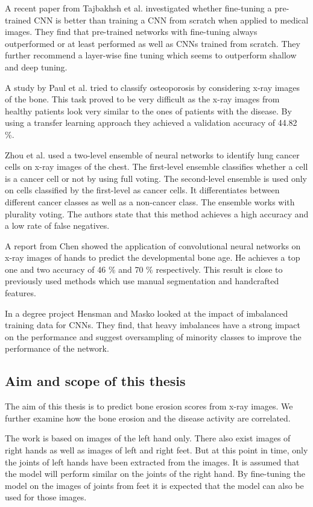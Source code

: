 \documentclass[12pt]{article}
\begin{document}
A recent paper from Tajbakhsh et al. \cite{tajbakhsh_2017} investigated whether fine-tuning a pre-trained CNN is better than training a CNN from scratch when applied to medical images. They find that pre-trained networks with fine-tuning always outperformed or at least performed as well as CNNs trained from scratch. They further recommend a layer-wise fine tuning which seems to outperform shallow and deep tuning.

A study by Paul et al. \cite{paul_2017} tried to classify osteoporosis by considering x-ray images of the bone. This task proved to be very difficult as the x-ray images from healthy patients look very similar to the ones of patients with the disease. By using a transfer learning approach they achieved a validation accuracy of 44.82 \%.

Zhou et al. \cite{zhou_2002} used a two-level ensemble of neural networks to identify lung cancer cells on x-ray images of the chest. The first-level ensemble classifies whether a cell is a cancer cell or not by using full voting. The second-level ensemble is used only on cells classified by the first-level as cancer cells. It differentiates between different cancer classes as well as a non-cancer class. The ensemble works with plurality voting. The authors state that this method achieves a high accuracy and a low rate of false negatives.

A report from Chen \cite{chen_2016} showed the application of convolutional neural networks on x-ray images of hands to predict the developmental bone age. He achieves a top one and two accuracy of 46 \% and 70 \% respectively. This result is close to previously used methods which use manual segmentation and handcrafted features.

In a degree project Hensman and Masko \cite{hensman_2015} looked at the impact of imbalanced training data for CNNs. They find, that heavy imbalances have a strong impact on the performance and suggest oversampling of minority classes to improve the performance of the network.

\subsection{Aim and scope of this thesis}

The aim of this thesis is to predict bone erosion scores from x-ray images. We further examine how the bone erosion and the disease activity are correlated.

The work is based on images of the left hand only. There also exist images of right hands as well as images of left and right feet. But at this point in time, only the joints of left hands have been extracted from the images. It is assumed that the model will perform similar on the joints of the right hand. By fine-tuning the model on the images of joints from feet it is expected that the model can also be used for those images.
\end{document}

